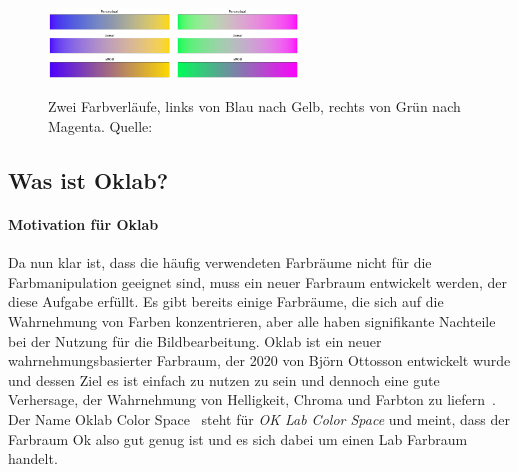 \documentclass[12pt, a4paper, ngerman]{article}
\begin{document}
\begin{figure}
  \centering
  \includegraphics[width=0.29\textwidth]{Grafiken/Farbverlauf/blueyellow.png}
  \includegraphics[width=0.29\textwidth]{Grafiken/Farbverlauf/greenmagenta.png}
  \caption{Zwei Farbverläufe, links von Blau nach Gelb, rechts von Grün nach Magenta. Quelle:~\cite{Ottosson_2020}}
  \label{fig:vergleich_zweifarbig}
\end{figure}

\subsection{Was ist Oklab?}

\paragraph{Motivation für Oklab}
Da nun klar ist, dass die häufig verwendeten Farbräume nicht für die Farbmanipulation geeignet sind, 
muss ein neuer Farbraum entwickelt werden, der diese Aufgabe erfüllt.
Es gibt bereits einige Farbräume, die sich auf die Wahrnehmung von Farben konzentrieren, 
aber alle haben signifikante Nachteile bei der Nutzung für die Bildbearbeitung.
\acs{Oklab} ist ein neuer wahrnehmungsbasierter Farbraum, der 2020 von Björn Ottosson entwickelt wurde und 
dessen Ziel es ist einfach zu nutzen zu sein und dennoch eine gute Verhersage, 
der  Wahrnehmung von Helligkeit, Chroma und Farbton zu liefern~\cite{Oklab_2020}.
Der Name \glqq Oklab Color Space\grqq~ steht für \emph{OK Lab Color Space} und meint, 
dass der Farbraum Ok also gut genug ist und es sich dabei um einen Lab Farbraum handelt.
\end{document}
